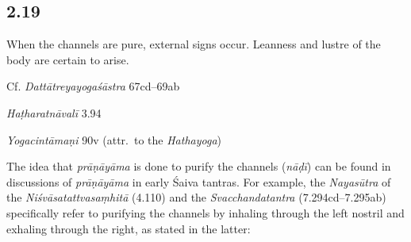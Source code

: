 \begin{ekdosis}
\subsection*{2.19}
\begin{translation}[hp02_019]
When the channels are pure, external signs occur. Leanness and lustre of the body are certain to arise.
\end{translation}

\begin{sources}[hp02_019]
Cf. \emph{Dattātreyayogaśāstra} 67cd--69ab

\begin{versinnote}
\end{versinnote}
\end{sources}

\begin{testimonia}[hp02_019]
\emph{Haṭharatnāvalī} 3.94

\begin{versinnote}
\end{versinnote}

\emph{Yogacintāmaṇi} 90v (attr.~to the \emph{Hathayoga})

\begin{versinnote}
\end{versinnote}
\end{testimonia}

\begin{philcomm}[hp02_019]
The idea that \emph{prāṇāyāma} is done to purify the channels (\emph{nāḍī}) can be found in discussions of \emph{prāṇāyāma} in early Śaiva tantras. For example, the \emph{Nayasūtra} of the \emph{Niśvāsatattvasaṃhitā} (4.110) and the \emph{Svacchandatantra} (7.294cd–7.295ab) specifically refer to purifying the channels by inhaling through the left nostril and exhaling through the right, as stated in the latter:


\end{philcomm}
\end{ekdosis}
